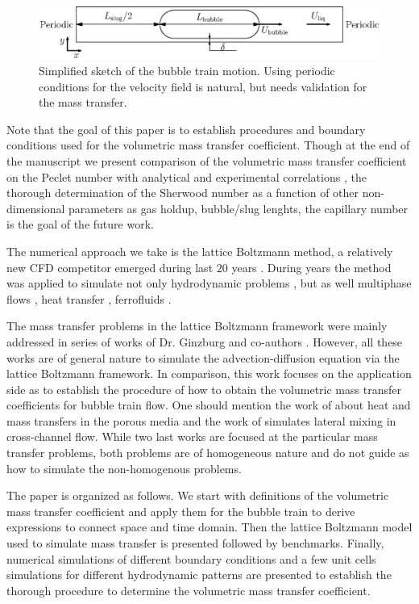 \documentclass{article}
\begin{document}
\begin{figure}[htb!]
\includegraphics[width=\textwidth]{Figures/benchmark_hydro.eps}
\caption{Simplified sketch of the bubble train motion. Using periodic conditions for the velocity
field is natural, but needs validation for the mass transfer. \label{fig:benchmark:hydro}}
\end{figure}
Note that the goal of this paper is to establish procedures and boundary conditions used for the volumetric mass transfer coefficient. Though at the end of the manuscript we present comparison of the volumetric mass transfer coefficient on the Peclet number with analytical \cite{irandoust} and experimental correlations \cite{yue-mass}, the thorough
determination of the Sherwood number as a function of
other non-dimensional parameters as gas holdup, bubble/slug lenghts, the capillary number is the goal of the future work.
 
The numerical approach we take is the lattice Boltzmann method, a relatively new CFD
competitor emerged during last $20$ years \cite{frisch,mcnamara,HJ,HSB}. During years the
method was applied to simulate not only hydrodynamic problems \cite{yu}, but as well multiphase
flows \cite{Shan-chen:extended,swift,gunstensen}, heat transfer
\cite{yuan-thermal,zhang-thermal}, ferrofluids \cite{dellar-ferro,kuzmin-aniso}.

The mass transfer problems in the lattice Boltzmann framework were mainly addressed in series of
works of Dr. Ginzburg and co-authors
\cite{ginzburg-main,ginzburg-boundary-conditions,ginzburg-saturated-flow}. However, all these works
are of general nature to simulate the advection-diffusion equation via the lattice Boltzmann
framework. In comparison, this work focuses on the application side as to establish the procedure of how to obtain the
volumetric mass transfer coefficients for bubble train flow. One should mention the work of
\citet{inamuro-scalar-boundary} about heat and mass transfers in the porous media and the work
of \citet{jos-mass} simulates lateral mixing in cross-channel flow. While two last works are focused
at the particular mass transfer problems, both problems are of homogeneous nature and do not
guide as how to simulate the non-homogenous problems.           

The paper is organized as follows. We start with definitions of the volumetric mass transfer coefficient and apply them 
for the bubble train to derive expressions to connect space and time domain. Then the lattice Boltzmann model used to simulate mass transfer is presented followed by benchmarks. Finally, numerical simulations of different boundary conditions and a few unit cells simulations for different hydrodynamic patterns are presented to establish the thorough procedure to determine the volumetric mass transfer coefficient. 
\end{document}

